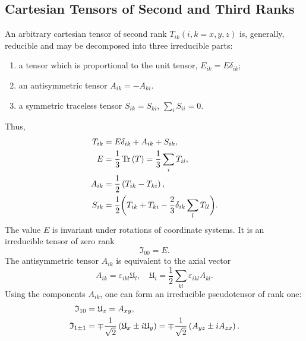 \subsection{Cartesian Tensors of Second and Third Ranks}\label{sec:3.2.2}
An arbitrary cartesian tensor of second rank $T_{i k}(i, k=x, y, z)$ is, generally, reducible and may be decomposed into three irreducible parts:
\begin{enumerate}[label=(\alph*)]
\item a tensor which is proportional to the unit tensor, $E_{i k}=E \delta_{i k}$;
\item an antisymmetric tensor $A_{i k}=-A_{k i}$.
\item a symmetric traceless tensor $S_{i k}=S_{k i}$, $\sum_{i} S_{i i}=0$.
\end{enumerate}
Thus,
\begin{align}
T_{i k}&=E \delta_{i k}+A_{i k}+S_{i k},  \label{eq:3:2:24}\\
E&=\frac{1}{3} \operatorname{Tr} \left(T\right)=\frac{1}{3} \sum_{i} T_{i i},  \label{eq:3:2:25}\\
A_{i k}&=\frac{1}{2}\left(T_{i k}-T_{k i}\right),  \label{eq:3:2:26}\\
S_{i k}&=\frac{1}{2}\biggl(T_{i k}+T_{k i}-\frac{2}{3} \delta_{i k} \sum_{l} T_{l l}\biggr) . \label{eq:3:2:27}
\end{align}
The value $E$ is invariant under rotations of coordinate systems. It is an irreducible tensor of zero rank
\begin{equation}
\mathfrak{I}_{00}=E . \label{eq:3:2:28}
\end{equation}
The antisymmetric tensor $A_{i k}$ is equivalent to the axial vector
\begin{equation}
A_{i k}=\varepsilon_{i k l} \mathfrak{U}_{l}, \quad \mathfrak{U}_{i}=\frac{1}{2} \sum_{k l} \varepsilon_{i k l} A_{k l}. \label{eq:3:2:29}
\end{equation}
Using the components $A_{i k}$, one can form an irreducible pseudotensor of rank one:
\begin{align}
\mathfrak{I}_{10}&=\mathfrak{U}_{z}=A_{x y} , \notag\\
\mathfrak{I}_{1 \pm 1}&=\mp \frac{1}{\sqrt{2}}\left(\mathfrak{U}_{x} \pm i \mathfrak{U}_{y}\right)=\mp \frac{1}{\sqrt{2}}\left(A_{y z} \pm i A_{z x}\right) .\label{eq:3:2:30}
\end{align}
